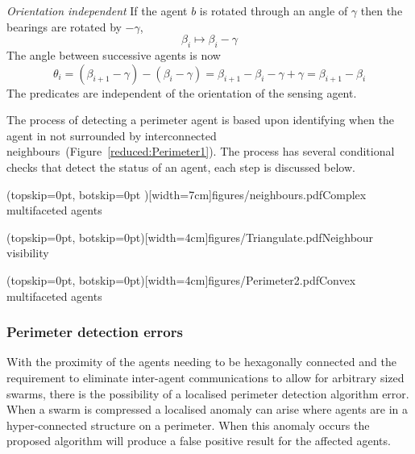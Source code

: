 \documentclass{ieeeaccess}
\begin{document}
\textit{Orientation independent}  If the agent $b$ is rotated through an angle of $\gamma$ then 
the bearings are rotated by $-\gamma$, \[ \beta_i\mapsto\beta_i-\gamma \]
The  angle between successive agents is now
\[
	\theta_i  =  (\beta_{i+1}-\gamma) - (\beta_i-\gamma)
	 = \beta_{i+1}-\beta_i-\gamma+\gamma
	 = \beta_{i+1}-\beta_i
\]
The predicates are independent of the orientation of the sensing agent.

The process of detecting a perimeter agent is based upon identifying when the agent in not surrounded by interconnected neighbours~(Figure~\ref{reduced:Perimeter1}). The process has several conditional checks that detect the status of an agent, each step is discussed below. 


\Figure[t!](topskip=0pt, botskip=0pt )[width=7cm]{figures/neighbours.pdf}{Complex multifaceted agents\label{reduced:Perimeter1}}

\Figure[t!](topskip=0pt, botskip=0pt)[width=4cm]{figures/Triangulate.pdf}{Neighbour visibility\label{reduced:Triangulate}}

\Figure[t!](topskip=0pt, botskip=0pt)[width=4cm]{figures/Perimeter2.pdf}{Convex multifaceted agents\label{reduced:Perimeter2}}

\subsubsection{Perimeter detection errors\label{section:PerimeterErrorLocalisation}}
With the proximity of the agents needing to be hexagonally connected and the requirement to eliminate inter-agent communications to allow for arbitrary sized swarms, there is the possibility of a localised perimeter detection algorithm error. When a swarm is compressed a localised anomaly can arise where agents are in a hyper-connected structure on a perimeter. When this anomaly occurs the proposed algorithm will produce a false positive result for the affected agents. 

\end{document}
